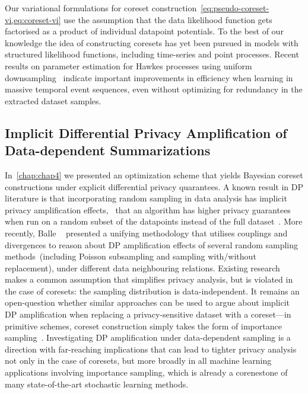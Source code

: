 Our variational formulations for coreset construction~\cref{eq:pseudo-coreset-vi,eq:coreset-vi} use the assumption that the data likelihood function gets factorised as a product of individual datapoint potentials. To the best of our knowledge the idea of constructing coresets has yet been pursued in models with structured likelihood functions, including time-series and point processes. Recent results on parameter estimation for Hawkes processes using uniform downsampling~\citep{li19} indicate important improvements in efficiency when learning in massive temporal event sequences, even without optimizing for redundancy in the extracted dataset samples.

\subsection{Implicit Differential Privacy Amplification of Data-dependent Summarizations}
\label{subsec:implicit-dp-amplification}

In~\cref{chap:chap4} we presented an optimization scheme that yields Bayesian coreset constructions under explicit differential privacy quarantees. A known result in DP literature is that incorporating random sampling in data analysis has implicit privacy amplification effects, \ie~that an algorithm has higher privacy guarantees when run on a random subset of the datapoints instead of the full dataset~\citep{li12, beimel13, bassily14, abadi16}. More recently, Balle \etal~\citep{balle18} presented a unifying methodology that utilises couplings and divergences to reason about DP amplification effects of several random sampling methods~(including Poisson subsampling and sampling with/without replacement), under different data neighbouring relations. Existing research makes a common assumption that simplifies privacy analysis, but is violated in the case of coresets: the sampling distribution is data-independent. It remains an open-question whether similar approaches can be used to argue about implicit DP amplification when replacing a privacy-sensitive dataset with a coreset---in primitive schemes, coreset construction simply takes the form of importance sampling~\citep{bachem17}. Investigating DP amplification under data-dependent sampling is a direction with far-reaching implications that can lead to tighter privacy analysis not only in the case of coresets, but more broadly in all machine learning applications involving importance sampling, which is already a corenestone of many state-of-the-art stochastic learning methods. 


